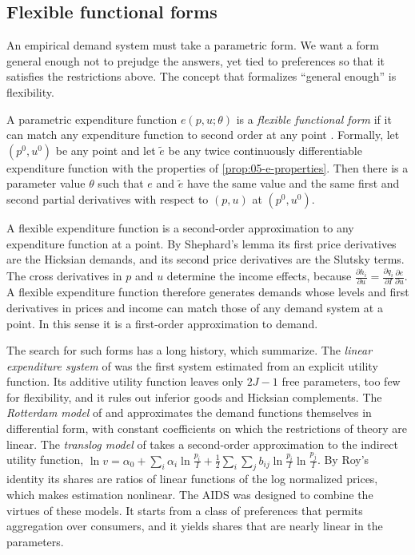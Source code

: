 \subsection{Flexible functional forms}\label{sec:05-flexible}

An empirical demand system must take a parametric form. We want a form general enough not to prejudge the
answers, yet tied to preferences so that it satisfies the restrictions above. The concept that formalizes
``general enough'' is flexibility.

\begin{definition}\label{def:05-flexible}
A parametric expenditure function $e(p, u; \theta)$ is a \emph{flexible functional form} if it can match
any expenditure function to second order at any point \citep{Diewert1974}. Formally, let $(p^0, u^0)$ be any
point and let $\tilde e$ be any twice continuously differentiable expenditure function with the properties of
\cref{prop:05-e-properties}. Then there is a parameter value $\theta$ such that $e$ and $\tilde e$ have the
same value and the same first and second partial derivatives with respect to $(p, u)$ at $(p^0, u^0)$.
\end{definition}

A flexible expenditure function is a second-order approximation to any expenditure function at a point. By
Shephard's lemma its first price derivatives are the Hicksian demands, and its second price derivatives are
the Slutsky terms. The cross derivatives in $p$ and $u$ determine the income effects, because
$\frac{\partial h_i}{\partial u} = \frac{\partial q_i}{\partial I}\frac{\partial e}{\partial u}$. A flexible
expenditure function therefore generates demands whose levels and first derivatives in prices and income can
match those of any demand system at a point. In this sense it is a first-order approximation to demand.

The search for such forms has a long history, which \citet[p.~312]{DeatonMuellbauer1980a} summarize. The
\emph{linear expenditure system} of \citet{Stone1954} was the first system estimated from an explicit utility
function. Its additive utility function leaves only $2J - 1$ free parameters, too few for flexibility, and it
rules out inferior goods and Hicksian complements. The \emph{Rotterdam model} of \citet{Theil1965} and
\citet{Barten1969} approximates the demand functions themselves in differential form, with constant
coefficients on which the restrictions of theory are linear. The \emph{translog model} of
\citet{ChristensenJorgensonLau1975} takes a second-order approximation to the indirect utility function,
$\ln v = \alpha_0 + \sum_i\alpha_i\ln\frac{p_i}{I} + \frac{1}{2}\sum_i\sum_j b_{ij}\ln\frac{p_i}{I}\ln\frac{p_j}{I}$.
By Roy's identity its shares are ratios of linear functions of the log normalized prices, which makes
estimation nonlinear. The AIDS was designed to combine the virtues of these models. It starts from a class
of preferences that permits aggregation over consumers, and it yields shares that are nearly linear in the
parameters.

